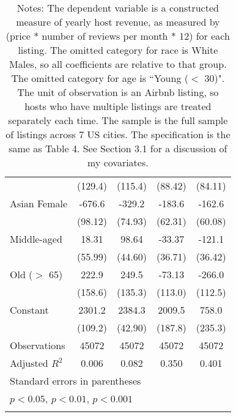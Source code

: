 {\begin{longtable}{l*{4}{c}}
                    &     (129.4)         &     (115.4)         &     (88.42)         &     (84.11)         \\
[1em]
Asian Female        &      -676.6\sym{***}&      -329.2\sym{***}&      -183.6\sym{**} &      -162.6\sym{**} \\
                    &     (98.12)         &     (74.93)         &     (62.31)         &     (60.08)         \\
[1em]
Middle-aged         &       18.31         &       98.64\sym{*}  &      -33.37         &      -121.1\sym{***}\\
                    &     (55.99)         &     (44.60)         &     (36.71)         &     (36.42)         \\
[1em]
Old ($>$ 65)                 &       222.9         &       249.5         &      -73.13         &      -266.0\sym{*}  \\
                    &     (158.6)         &     (135.3)         &     (113.0)         &     (112.5)         \\
[1em]
Constant            &      2301.2\sym{***}&      2384.3\sym{***}&      2009.5\sym{***}&       758.0\sym{**} \\
                    &     (109.2)         &     (42.90)         &     (187.8)         &     (235.3)         \\
\hline
Observations        &       45072         &       45072         &       45072         &       45072         \\
Adjusted \(R^{2}\)  &       0.006         &       0.082         &       0.350         &       0.401         \\
\hline\hline
\multicolumn{5}{l}{\footnotesize Standard errors in parentheses}\\
\multicolumn{5}{l}{\footnotesize \sym{*} \(p<0.05\), \sym{**} \(p<0.01\), \sym{***} \(p<0.001\)}\\
\caption*{Notes: The dependent variable is a constructed measure of yearly host revenue, as measured by (price * number of reviews per month * 12) for each listing. The omitted category for race is White Males, so all coefficients are relative to that group. The omitted category for age is ``Young ($<$ 30)". The unit of observation is an Airbnb listing, so hosts who have multiple listings are treated separately each time. The sample is the full sample of listings across 7 US cities. The specification is the same as Table 4. See Section 3.1 for a discussion of my covariates. }
\end{longtable}
}


